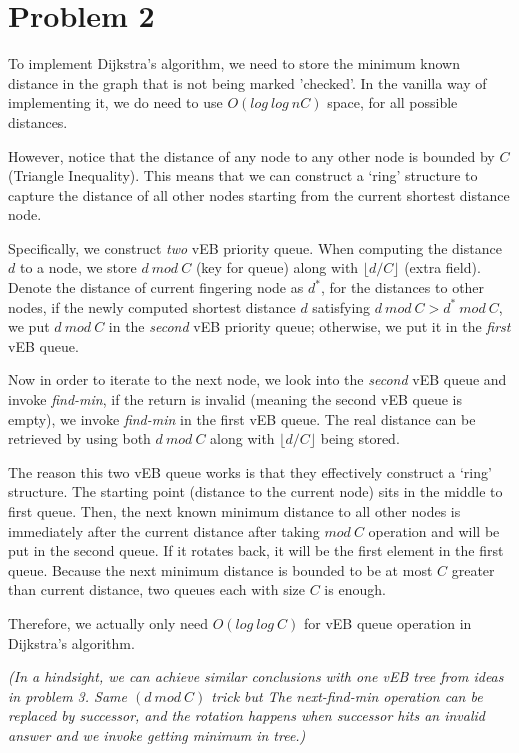 \documentclass[12pt]{article}
\begin{document}
\section*{Problem 2}

To implement Dijkstra's algorithm, we need to store the minimum known distance in the graph that is not being marked 'checked'. In the vanilla way of implementing it, we do need to use $O(log\:log\: nC)$ space, for all possible distances. 

However, notice that the distance of any node to any other node is bounded by $C$ (Triangle Inequality). This means that we can construct a `ring' structure to capture the distance of all other nodes starting from the current shortest distance node. 

Specifically, we construct \emph{two} vEB priority queue. When computing the distance $d$ to a node, we store $d \: mod \: C$ (key for queue) along with $\lfloor d/C\rfloor$ (extra field). Denote the distance of current fingering node as $d^*$, for the distances to other nodes, if the newly computed shortest distance $d$ satisfying $d \: mod \: C > d^* \: mod \: C$, we put $d \: mod \: C$ in the \emph{second} vEB priority queue; otherwise, we put it in the \emph{first} vEB queue. 

Now in order to iterate to the next node, we look into the \emph{second} vEB queue and invoke \emph{find-min}, if the return is invalid (meaning the second vEB queue is empty), we invoke \emph{find-min} in the first vEB queue. The real distance can be retrieved by using both $d \: mod \: C$ along with $\lfloor d/C\rfloor$ being stored.

The reason this two vEB queue works is that they effectively construct a `ring' structure. The starting point (distance to the current node) sits in the middle to first queue. Then, the next known minimum distance to all other nodes is immediately after the current distance after taking $mod\:C$ operation and will be put in the second queue. If it rotates back, it will be the first element in the first queue. Because the next minimum distance is bounded to be at most $C$ greater than current distance, two queues each with size $C$ is enough.

Therefore, we actually only need $O(log\:log\:C)$ for vEB queue operation in Dijkstra's algorithm.

\emph{\big(In a hindsight, we can achieve similar conclusions with one vEB tree from ideas in problem 3. Same $(d\:mod\:C)$ trick but The next-find-min operation can be replaced by successor, and the rotation happens when successor hits an invalid answer and we invoke getting minimum in tree.\big)}
\end{document}

